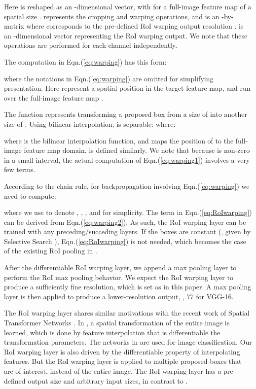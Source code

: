 \documentclass[10pt,twocolumn,letterpaper]{article}
\begin{document}
Here  is reshaped as an -dimensional vector, with  for a full-image feature map of a spatial size .  represents the cropping and warping operations, and is an -by- matrix where  corresponds to the pre-defined RoI warping output resolution .
 is an -dimensional vector representing the RoI warping output. We note that these operations are performed for each channel independently.

The computation in Eqn.(\ref{eq:warping}) has this form:

where the notations  in Eqn.(\ref{eq:warping}) are omitted for simplifying presentation. Here  represent a spatial position in the target  feature map, and  run over the full-image feature map .

The function  represents transforming a proposed box  from a size of  into another size of . Using bilinear interpolation,  is separable:  where:
\vspace{-.5em}

where  is the bilinear interpolation function, and  maps the position of  to the full-image feature map domain.
 is defined similarly. We note that because  is non-zero in a small interval, the actual computation of Eqn.(\ref{eq:warping1}) involves a very few terms.

According to the chain rule, for backpropagation involving Eqn.(\ref{eq:warping}) we need to compute:

where we use  to denote , , , and  for simplicity. The term  in Eqn.(\ref{eq:RoIwarping}) can be derived from Eqn.(\ref{eq:warping2}). As such, the RoI warping layer can be trained with any preceding/succeding layers. If the boxes are constant (\eg, given by Selective Search \cite{Uijlings2013}), Eqn.(\ref{eq:RoIwarping}) is not needed, which becomes the case of the existing RoI pooling in \cite{Girshick2015}.

After the differentiable RoI warping layer, we append a max pooling layer to perform the RoI max pooling behavior. We expect the RoI warping layer to produce a sufficiently fine resolution, which is set as  in this paper. A max pooling layer is then applied to produce a lower-resolution output, \eg, 77 for VGG-16.

The RoI warping layer shares similar motivations with the recent work of Spatial Transformer Networks \cite{Jaderberg2015}. In \cite{Jaderberg2015}, a spatial transformation of the entire image is learned, which is done by feature interpolation that is differentiable \wrt the transformation parameters. The networks in \cite{Jaderberg2015} are used for image classification. Our RoI warping layer is also driven by the differentiable property of interpolating features.
But the RoI warping layer is applied to multiple proposed boxes that are of interest, instead of the entire image. The RoI warping layer has a pre-defined output size and arbitrary input sizes, in contrast to \cite{Jaderberg2015}.
\end{document}
